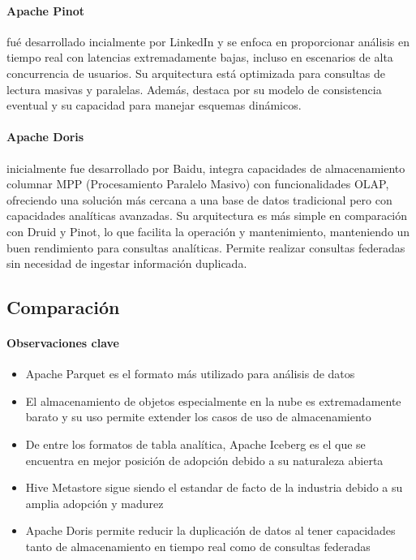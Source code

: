\paragraph{Apache Pinot} 
fué desarrollado incialmente por LinkedIn y se enfoca en proporcionar análisis en tiempo real con latencias extremadamente bajas, 
incluso en escenarios de alta concurrencia de usuarios. 
Su arquitectura está optimizada para consultas de lectura masivas y paralelas. 
Además, destaca por su modelo de consistencia eventual y su capacidad para manejar esquemas dinámicos.

\paragraph{Apache Doris} 
inicialmente fue desarrollado por Baidu, integra capacidades de almacenamiento columnar MPP (Procesamiento Paralelo Masivo) con funcionalidades OLAP, 
ofreciendo una solución más cercana a una base de datos tradicional pero con capacidades analíticas avanzadas. 
Su arquitectura es más simple en comparación con Druid y Pinot, lo que facilita la operación y mantenimiento, manteniendo un buen rendimiento para consultas analíticas.
Permite realizar consultas federadas sin necesidad de ingestar información duplicada.

\newpage

\subsection{Comparación}

\paragraph{Observaciones clave}
\begin{itemize}
    \item Apache Parquet es el formato más utilizado para análisis de datos
    \item El almacenamiento de objetos especialmente en la nube es extremadamente barato y su uso permite extender los casos de uso de almacenamiento
    \item De entre los formatos de tabla analítica, Apache Iceberg es el que se encuentra en mejor posición de adopción debido a su naturaleza abierta
    \item Hive Metastore sigue siendo el estandar de facto de la industria debido a su amplia adopción y madurez
    \item Apache Doris permite reducir la duplicación de datos al tener capacidades tanto de almacenamiento en tiempo real como de consultas federadas
\end{itemize}
\newpage